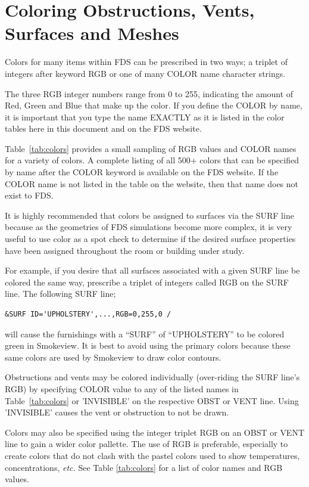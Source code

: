 \documentclass[11pt]{book}
\begin{document}
\section{Coloring Obstructions, Vents, Surfaces and Meshes}%
\label{info:colors}

Colors for many items within FDS can be prescribed in two ways; a triplet of
integers after keyword {\ct RGB} or one of many {\ct COLOR} name character strings.

The three {\ct RGB} integer numbers range from 0 to 255, indicating the amount of Red, Green and Blue
that make up the color. If you define the {\ct COLOR} by name, it is important that you type the name EXACTLY as it
is listed in the color tables here in this document and on the FDS website.

Table~\ref{tab:colors} provides a small sampling of {\ct RGB} values and {\ct COLOR} names
for a variety of colors. A complete listing of all 500+ colors that can be
specified by name after the {\ct COLOR} keyword is available on the FDS website.
If the {\ct COLOR} name is not listed in the table on the website, then that name does not exist to FDS.

It is highly recommended that colors be assigned to surfaces via the {\ct SURF} line because as
the geometries of FDS simulations become more complex, it is very useful
to use color as a spot check to determine if the desired
surface properties have been assigned throughout the room or building under study.

For example, if you desire that all surfaces associated with a
given {\ct SURF} line be colored the same way, prescribe a triplet of
integers called {\ct RGB} on the {\ct SURF} line. The following {\ct SURF} line;
\footnotesize
\begin{verbatim}
&SURF ID='UPHOLSTERY',...,RGB=0,255,0 /
\end{verbatim}
\normalsize
will cause the furnishings with a ``SURF'' of ``UPHOLSTERY'' to be colored green in Smokeview.
It is best to avoid using the primary colors because these same colors are
used by Smokeview to draw color contours.

Obstructions and vents may be colored individually (over-riding the
{\ct SURF} line's {\ct RGB}) by specifying {\ct COLOR} value to any of
the listed names in Table~\ref{tab:colors} or {\ct 'INVISIBLE'} on
the respective {\ct OBST} or {\ct VENT} line. Using {\ct 'INVISIBLE'}
causes the vent or obstruction to not be drawn.

Colors may also be specified using the integer triplet {\ct RGB} on an {\ct OBST} or {\ct VENT} line to gain
a wider color pallette. The use of {\ct RGB} is preferable, especially
to create colors that do not clash with the pastel colors used to
show temperatures, concentrations, {\em etc.} See Table \ref{tab:colors}
for a list of color names and RGB values.
\end{document}
